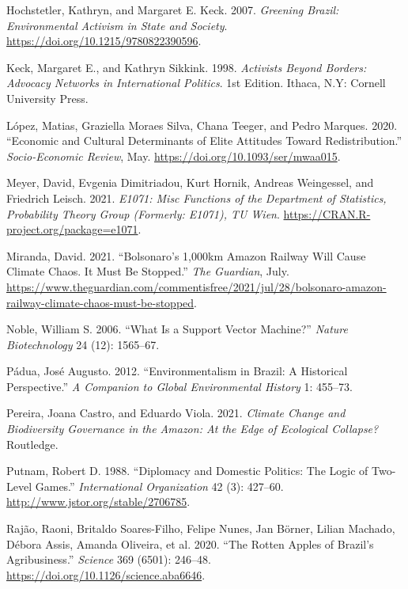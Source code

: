 \documentclass[
  12pt,
]{article}
\newlength{\cslhangindent}
\newlength{\cslentryspacingunit} %
\newenvironment{CSLReferences}[2] %
 {%
  \setlength{\parindent}{0pt}
  \ifodd #1
  \let\oldpar\par
  \def\par{\hangindent=\cslhangindent\oldpar}
  \fi
  \setlength{\parskip}{#2\cslentryspacingunit}
 }%
 {}
\begin{document}
\begin{CSLReferences}{1}{0}
\leavevmode{}%
Hochstetler, Kathryn, and Margaret E. Keck. 2007. \emph{Greening Brazil:
Environmental Activism in State and Society}.
\url{https://doi.org/10.1215/9780822390596}.

\leavevmode{}%
Keck, Margaret E., and Kathryn Sikkink. 1998. \emph{Activists Beyond
Borders: Advocacy Networks in International Politics}. 1st Edition.
Ithaca, N.Y: Cornell University Press.

\leavevmode{}%
López, Matias, Graziella Moraes Silva, Chana Teeger, and Pedro Marques.
2020. {``Economic and Cultural Determinants of Elite Attitudes Toward
Redistribution.''} \emph{Socio-Economic Review}, May.
\url{https://doi.org/10.1093/ser/mwaa015}.

\leavevmode{}%
Meyer, David, Evgenia Dimitriadou, Kurt Hornik, Andreas Weingessel, and
Friedrich Leisch. 2021. \emph{E1071: Misc Functions of the Department of
Statistics, Probability Theory Group (Formerly: E1071), TU Wien}.
\url{https://CRAN.R-project.org/package=e1071}.

\leavevmode{}%
Miranda, David. 2021. {``Bolsonaro{'}s 1,000km Amazon Railway Will Cause
Climate Chaos. It Must Be Stopped.''} \emph{The Guardian}, July.
\url{https://www.theguardian.com/commentisfree/2021/jul/28/bolsonaro-amazon-railway-climate-chaos-must-be-stopped}.

\leavevmode{}%
Noble, William S. 2006. {``What Is a Support Vector Machine?''}
\emph{Nature Biotechnology} 24 (12): 1565--67.

\leavevmode{}%
Pádua, José Augusto. 2012. {``Environmentalism in Brazil: A Historical
Perspective.''} \emph{A Companion to Global Environmental History} 1:
455--73.

\leavevmode{}%
Pereira, Joana Castro, and Eduardo Viola. 2021. \emph{Climate Change and
Biodiversity Governance in the Amazon: At the Edge of Ecological
Collapse?} Routledge.

\leavevmode{}%
Putnam, Robert D. 1988. {``Diplomacy and Domestic Politics: The Logic of
Two-Level Games.''} \emph{International Organization} 42 (3): 427--60.
\url{http://www.jstor.org/stable/2706785}.

\leavevmode{}%
Rajão, Raoni, Britaldo Soares-Filho, Felipe Nunes, Jan Börner, Lilian
Machado, Débora Assis, Amanda Oliveira, et al. 2020. {``The Rotten
Apples of Brazil's Agribusiness.''} \emph{Science} 369 (6501): 246--48.
\url{https://doi.org/10.1126/science.aba6646}.


\end{CSLReferences}
\end{document}
